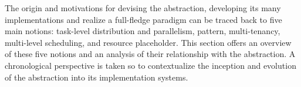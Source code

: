 \documentclass{sig-alternate}
\begin{document}






The origin and motivations for devising the \pilot abstraction, developing its
many implementations and realize a full-fledge \pilot paradigm can be traced
back to five main notions: task-level distribution and parallelism, \MW pattern,
multi-tenancy, multi-level scheduling, and resource placeholder. This section
offers an overview of these five notions and an analysis of their relationship
with the \pilot abstraction. A chronological perspective is taken so to
contextualize the inception and evolution of the \pilot abstraction into its
implementation systems.


\end{document}
